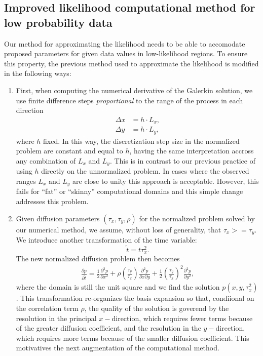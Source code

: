 \documentclass[10pt]{article}
\begin{document}
\subsection{Improved likelihood computational method for low
  probability data} \label{sec:improvements} Our method for
approximating the likelihood needs to be able to accomodate proposed
parameters for given data values in low-likelihood regions. To ensure
this property, the previous method used to approximate the likelihood
is modified in the following ways:
\begin{enumerate}
\item First, when computing the numerical derivative of the Galerkin
  solution, we use finite difference steps \textit{proportional} to
  the range of the process in each direction
  \begin{align}
    \Delta x &= h \cdot L_x, \\
    \Delta y &= h \cdot L_y,
  \end{align}
  where $h$ fixed. In this way, the discretization step size in the
  normalized problem are constant and equal to $h$, having the same
  interpretation accross any combination of $L_x$ and $L_y$. This is
  in contrast to our previous practice of using $h$ directly on the
  unnormalized problem. In cases where the observed ranges $L_x$ and
  $L_y$ are close to unity this approach is acceptable. However, this
  fails for ``fat'' or ``skinny'' computational domains and this
  simple change addresses this problem. 

\item Given diffusion parameters $(\tau_x, \tau_y, \rho)$ for the
  normalized problem solved by our numerical method, we assume,
  without loss of generality, that $\tau_x >= \tau_y$. We introduce
  another transformation of the time variable:
  \[ \tilde{t} = t\tau_x^2.\]
  The new normalized diffusion problem then becomes
  \begin{align}
    \frac{\partial p}{\partial \tilde{t}} = \frac{1}{2}
    \frac{\partial^2 p}{\partial x^2} + \rho
    \left(\frac{\tau_y}{\tau_x}\right)\frac{\partial^2 p}{\partial
      x\partial y} + \frac{1}{2}\left(\frac{\tau_y}{\tau_x}\right)^2
    \frac{\partial^2 p}{\partial y^2}, \label{eq:new-normalized}
  \end{align}
  where the domain is still the unit square and we find the solution
  $p(x,y,\tau_x^2)$. This transformation re-organizes the basis
  expansion so that, condiional on the correlation term $\rho$, the
  quality of the solution is goverend by the resolution in the
  principal $x-$direction, which requires fewer terms because of the
  greater diffusion coefficient, and the resolution in the
  $y-$direction, which requires more terms because of the smaller
  diffusion coefficient. This motivatives the next augmentation of the
  computational method.


\end{enumerate}
\end{document}
